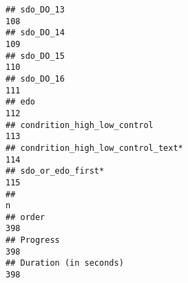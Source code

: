 \documentclass[
]{article}
\begin{document}
\begin{verbatim}
## sdo_DO_13                                                                                                                                                                                                                   108
## sdo_DO_14                                                                                                                                                                                                                   109
## sdo_DO_15                                                                                                                                                                                                                   110
## sdo_DO_16                                                                                                                                                                                                                   111
## edo                                                                                                                                                                                                                         112
## condrition_high_low_control                                                                                                                                                                                                 113
## condrition_high_low_control_text*                                                                                                                                                                                           114
## sdo_or_edo_first*                                                                                                                                                                                                           115
##                                                                                                                                                                                                                              n
## order                                                                                                                                                                                                                      398
## Progress                                                                                                                                                                                                                   398
## Duration (in seconds)                                                                                                                                                                                                      398

\end{verbatim}
\end{document}
